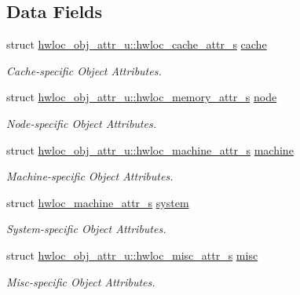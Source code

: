 \subsection*{Data Fields}
\begin{DoxyCompactItemize}
\item 
struct \hyperlink{structhwloc__obj__attr__u_1_1hwloc__cache__attr__s}{hwloc\_\-obj\_\-attr\_\-u::hwloc\_\-cache\_\-attr\_\-s} \hyperlink{unionhwloc__obj__attr__u_ab5a8ae3bf490e6b1071fea53f7382836}{cache}
\begin{DoxyCompactList}\small\item\em Cache-\/specific Object Attributes. \item\end{DoxyCompactList}\item 
struct \hyperlink{structhwloc__obj__attr__u_1_1hwloc__memory__attr__s}{hwloc\_\-obj\_\-attr\_\-u::hwloc\_\-memory\_\-attr\_\-s} \hyperlink{unionhwloc__obj__attr__u_a941994ad83275213249f8adfd8204465}{node}
\begin{DoxyCompactList}\small\item\em Node-\/specific Object Attributes. \item\end{DoxyCompactList}\item 
struct \hyperlink{structhwloc__obj__attr__u_1_1hwloc__machine__attr__s}{hwloc\_\-obj\_\-attr\_\-u::hwloc\_\-machine\_\-attr\_\-s} \hyperlink{unionhwloc__obj__attr__u_a5b42966df7c5bfdc36891e414cc31607}{machine}
\begin{DoxyCompactList}\small\item\em Machine-\/specific Object Attributes. \item\end{DoxyCompactList}\item 
struct \hyperlink{structhwloc__obj__attr__u_1_1hwloc__machine__attr__s}{hwloc\_\-machine\_\-attr\_\-s} \hyperlink{unionhwloc__obj__attr__u_aa65b98d3eada000628dc66668e4954df}{system}
\begin{DoxyCompactList}\small\item\em System-\/specific Object Attributes. \item\end{DoxyCompactList}\item 
struct \hyperlink{structhwloc__obj__attr__u_1_1hwloc__misc__attr__s}{hwloc\_\-obj\_\-attr\_\-u::hwloc\_\-misc\_\-attr\_\-s} \hyperlink{unionhwloc__obj__attr__u_a33b7e687b61be1b62e22f4037788582c}{misc}
\begin{DoxyCompactList}\small\item\em Misc-\/specific Object Attributes. \item\end{DoxyCompactList}\end{DoxyCompactItemize}


